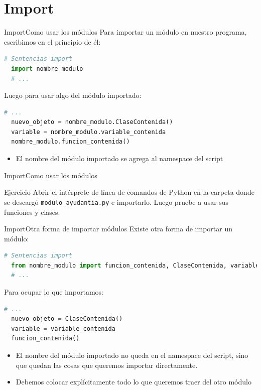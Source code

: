 \documentclass[spanish]{beamer}
\begin{document}
\section{Import}
\begin{frame}[fragile]{Import}{Como usar los módulos}
  Para importar un módulo en nuestro programa, escribimos en el principio de él:\\
  \begin{lstlisting}[language=Python]
  # Sentencias import
  import nombre_modulo
  # ...
  \end{lstlisting}
  Luego para usar algo del módulo importado:
  \begin{lstlisting}[language=Python]
  # ...
  nuevo_objeto = nombre_modulo.ClaseContenida()
  variable = nombre_modulo.variable_contenida
  nombre_modulo.funcion_contenida()
  \end{lstlisting}
  
  \begin{itemize}
      \item El nombre del módulo importado se agrega al namespace del script
  \end{itemize}
\end{frame}

\begin{frame}{Import}{Como usar los módulos}
    \begin{block}{Ejercicio}
    Abrir el intérprete de línea de comandos de Python en la carpeta donde se descargó \texttt{modulo\_ayudantia.py} e importarlo. Luego pruebe a usar sus funciones y clases.
    \end{block}
\end{frame}

\begin{frame}[fragile]{Import}{Otra forma de importar módulos}
  Existe otra forma de importar un módulo:
  \begin{lstlisting}[language=Python]
  # Sentencias import
  from nombre_modulo import funcion_contenida, ClaseContenida, variable_contenida
  # ...
  \end{lstlisting}
  
  Para ocupar lo que importamos:
  \begin{lstlisting}[language=Python]
  # ...
  nuevo_objeto = ClaseContenida()
  variable = variable_contenida
  funcion_contenida()
  \end{lstlisting}
    
  \begin{itemize}
    \item El nombre del módulo importado no queda en el namespace del script, sino que quedan las cosas que queremos importar directamente.
    \item Debemos colocar explícitamente todo lo que queremos traer del otro módulo
  \end{itemize}
  
\end{frame}
\end{document}
